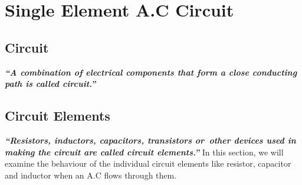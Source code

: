 \section{Single Element A.C Circuit}
\subsection*{Circuit}
\textit{\textbf{“A combination of electrical components that form a close conducting path is called circuit.”}}
\subsection*{Circuit Elements}
\textit{\textbf{“Resistors, inductors, capacitors, transistors or\
other devices used in making the circuit are called circuit elements.”}}
In this section, we will examine the behaviour of the individual
circuit elements like resistor,
capacitor and inductor when an A.C flows through them.
